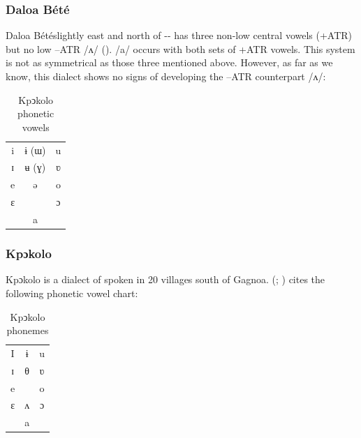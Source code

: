 \documentclass[output=paper,newtxmath,modfonts,nonflat,draft]{langsci/langscibook}
\begin{document}
\subsubsection{ {Daloa} Bété}
{Daloa} Bétéslightly east and north of -- has three non-low central vowels (+ATR) but no low –ATR /ʌ/ (\citealt{Zogbo2005}). /a/ occurs with both sets of +ATR vowels. This system is not as symmetrical as those three mentioned above. However, as far as we know, this dialect shows no signs of developing the –ATR counterpart /ʌ/: 

\begin{table}
\begin{tabular}{ccc}
i  &  ɨ (ɯ) &   u\\

ɪ  &  ʉ (ɣ)  &  ʋ\\

e  &  ə  &  o\\

ɛ  &   &   ɔ\\

&a&\\
\end{tabular}
\caption{Kpↄkolo phonetic vowels}
\label{tab:zogbo:11}
\end{table}

\subsubsection{Kpɔkolo} 
Kpɔkolo
is a dialect of  spoken in 20 villages south of Gagnoa. \citeauthor{Goprou2014} (\citeyear{Goprou2010}; \citeyear[175, 179]{Goprou2014}) cites the following phonetic vowel chart: 

\begin{table}
\caption{Kpↄkolo phonemes}
\label{tab:zogbo:12}
\begin{tabular}{ccc}
I  &  ɨ  &  u\\

ɪ  &  θ  &  ʋ\\

e   & &    o\\

ɛ   & ʌ  &  ɔ\\

	& a\\
\end{tabular}	
\end{table}
\end{document}
